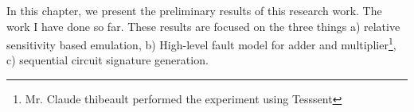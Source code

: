 

In this chapter, we present the preliminary results of this research work. The work I have done so far. These results are focused on the three things a) relative sensitivity based emulation, b) High-level fault model for adder and multiplier\footnote{Mr. Claude thibeault performed the experiment using Tesssent }, c) sequential circuit signature generation.





\label{preliminary}
